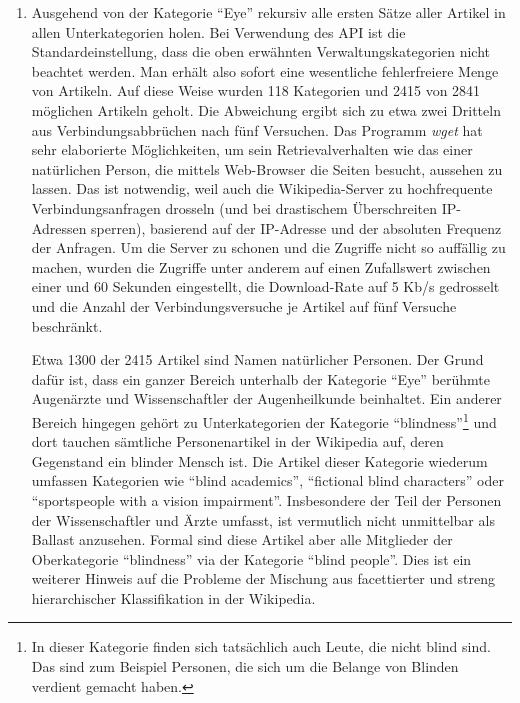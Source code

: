 \documentclass[pagesize,paper=A4,DIV=calc,fontsize=12pt,draft=false]{scrreprt}
\begin{document}
\begin{enumerate}
\item Ausgehend von der Kategorie \enquote{Eye} rekursiv alle ersten Sätze aller Artikel in allen Unterkategorien holen. 
Bei Verwendung des API ist die Standardeinstellung, dass die oben erwähnten Verwaltungskategorien nicht beachtet werden. 
Man erhält also sofort eine wesentliche fehlerfreiere Menge von Artikeln. 
Auf diese Weise wurden 118 Kategorien und 2415 von 2841 möglichen Artikeln geholt. 
Die Abweichung ergibt sich zu etwa zwei Dritteln aus Verbindungsabbrüchen nach fünf Versuchen. 
Das Programm \emph{wget} hat sehr elaborierte Möglichkeiten, um sein Retrievalverhalten wie das einer natürlichen Person, die mittels Web-Browser die Seiten besucht, aussehen zu lassen. 
Das ist notwendig, weil auch die Wikipedia-Server zu hochfrequente Verbindungsanfragen drosseln (und bei drastischem Überschreiten IP-Adressen sperren), basierend auf der IP-Adresse und der absoluten Frequenz der Anfragen. 
Um die Server zu schonen und die Zugriffe nicht so auffällig zu machen, wurden die Zugriffe unter anderem auf einen Zufallswert zwischen einer und 60 Sekunden eingestellt, die Download-Rate auf 5 Kb/s gedrosselt und die Anzahl der Verbindungsversuche je Artikel auf fünf Versuche beschränkt. 

Etwa 1300 der 2415 Artikel sind Namen natürlicher Personen. 
Der Grund dafür ist, dass ein ganzer Bereich unterhalb der Kategorie \enquote{Eye} berühmte Augenärzte und Wissenschaftler der Augenheilkunde beinhaltet.
Ein anderer Bereich hingegen gehört zu Unterkategorien der Kategorie \enquote{blindness}\footnote{In dieser Kategorie finden sich tatsächlich auch Leute, die nicht blind sind. Das sind zum Beispiel Personen, die sich um die Belange von Blinden verdient gemacht haben.} und dort tauchen sämtliche Personenartikel in der Wikipedia auf, deren Gegenstand ein blinder Mensch ist.
Die Artikel dieser Kategorie wiederum umfassen Kategorien wie \enquote{blind academics}, \enquote{fictional blind characters} oder \enquote{sportspeople with a vision impairment}. 
Insbesondere der Teil der Personen der Wissenschaftler und Ärzte umfasst, ist vermutlich nicht unmittelbar als Ballast anzusehen. 
Formal sind diese Artikel aber alle Mitglieder der Oberkategorie \enquote{blindness} via der Kategorie \enquote{blind people}. 
Dies ist ein weiterer Hinweis auf die Probleme der Mischung aus facettierter und streng hierarchischer Klassifikation in der Wikipedia.


\end{enumerate}
\end{document}
